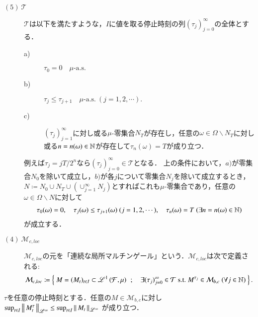 \begin{description}
		\item[$\mathrm{(5)}\ \mathcal{T}$]
			$\mathcal{T}$は以下を満たすような，$I$に値を取る停止時刻の列$(\tau_j)_{j=0}^{\infty}$の全体とする．
			\begin{description}
				\item[a)] $\tau_0 = 0 \quad \mbox{$\mu$-a.s.}$
				\item[b)] $\tau_j \leq \tau_{j+1} \quad \mbox{$\mu$-a.s.}\ (j=1,2,\cdots).$
				\item[c)] $(\tau_j)_{j=1}^{\infty}$に対し或る$\mu$-零集合$N_T$が存在し，任意の$\omega \in \Omega \backslash N_T$に対し或る$n = n(\omega) \in \mathbb{N}$が存在して$\tau_n(\omega)=T$が成り立つ．
			\end{description}
			例えば$\tau_j = jT/2^n$なら$(\tau_j)_{j=0}^{\infty} \in \mathcal{T}$となる．
			上の条件において，$a)$が零集合$N_0$を除いて成立し，$b)$が各$j$について零集合$N_j$を除いて成立するとき，
			$N \coloneqq N_0 \cup N_T \cup (\cup_{j=1}^{\infty}N_j)$とすればこれも$\mu$-零集合であり，任意の$\omega \in \Omega \backslash N$に対して
			\begin{align}
				\tau_0(\omega) = 0,\quad \tau_j(\omega) \leq \tau_{j+1}(\omega)\ (j=1,2,\cdots),\quad
				\tau_n(\omega) = T\ (\exists n = n(\omega) \in \mathbb{N})
			\end{align}
			が成立する．
			
		\item[$\mathrm{(4)}\ \mathcal{M}_{c,loc}$]
			$\mathcal{M}_{c,loc}$の元を「連続な局所マルチンゲール」という．$\mathcal{M}_{c,loc}$は次で定義される:
			\begin{align}
				\mathcal{M}_{c,loc} \coloneqq 
				\left\{\ M = (M_t)_{t \in I} \subset \mathscr{L}^{1} \left(\mathcal{F},\mu\right)\ \, ; \quad \exists (\tau_j)_{j=0}^{\infty} \in \mathcal{T}\ \mathrm{s.t.}\ M^{\tau_j} \in \mathcal{M}_{b,c}\ (\forall j \in \mathbb{N})\ \right\}.
			\end{align}
	\end{description}
	
	\begin{screen}
		\begin{thm}[有界なマルチンゲールを停止時刻で停めた過程の有界性]
			$\tau$を任意の停止時刻とする．任意の$M \in \mathcal{M}_{b,c}$に対し
			$\operatorname*{sup}_{t \in I} \left\|\, M_t^\tau\, \right\|_{\mathscr{L}^\infty} \leq \operatorname*{sup}_{t \in I} \left\|\, M_t\, \right\|_{\mathscr{L}^\infty}$
			が成り立つ．
			\label{thm:boundedness_of_stopped_process_of_bounded_martingale}
		\end{thm}
	\end{screen}
	
